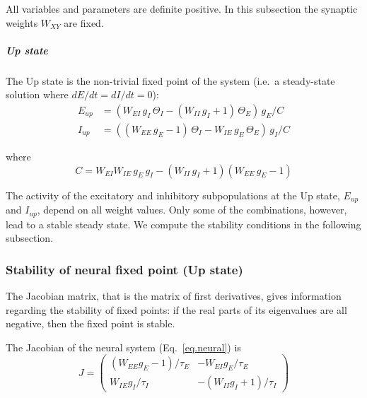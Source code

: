 \documentclass[
twocolumn,
]{article}
\newcommand{\EE}{\mathit{EE}}
\newcommand{\EI}{\mathit{EI}}
\newcommand{\IE}{\mathit{IE}}
\newcommand{\II}{\mathit{II}}
\newcommand{\up}{\mathit{up}}
\begin{document}
\noindent All variables and parameters are definite positive. In this subsection the synaptic weights $W_{\mathit{XY}}$ are fixed.


\subparagraph{Up state} The Up state is the non-trivial fixed point of the system (i.e.\ a steady-state solution where $dE/dt=dI/dt=0$):
\begin{equation}
\begin{aligned}
E_{\up} & = (W_{\EI} \, g_I \, \Theta_I - (W_{\II} \, g_I + 1) \, \Theta_E) \, g_E / C \\
I_{\up} & = ((W_{\EE} \, g_E - 1) \, \Theta_I - W_{\IE} \, g_E \, \Theta_E) \, g_I / C
\end{aligned}
\label{eq.upstate_orig}
\end{equation}

\noindent where
\begin{equation}
C = W_{\EI} W_{\IE} \, g_E\, g_I - (W_{\II} \, g_I + 1)(W_{\EE} \, g_E - 1)
\label{eq.den}
\end{equation}

The activity of the excitatory and inhibitory subpopulations at the Up state, $E_{\up}$ and $I_{\up}$, depend on all weight values. Only some of the combinations, however, lead to a stable steady state. We compute the stability conditions in the following subsection.


\subsubsection{Stability of neural fixed point (Up state)}

The Jacobian matrix, that is the matrix of first derivatives, gives information regarding the stability of fixed points: if the real parts of its eigenvalues are all negative, then the fixed point is stable.

The Jacobian of the neural system (Eq.\ \ref{eq.neural}) is
\begin{equation}
J = \left(\begin{array}{rr}
(W_{\EE} g_E - 1)/\tau_E & -W_{\EI} g_E/\tau_E \\
W_{\IE} g_I/\tau_I & -(W_{\II} g_I + 1)/\tau_I
\end{array}\right)
\end{equation}
\end{document}
